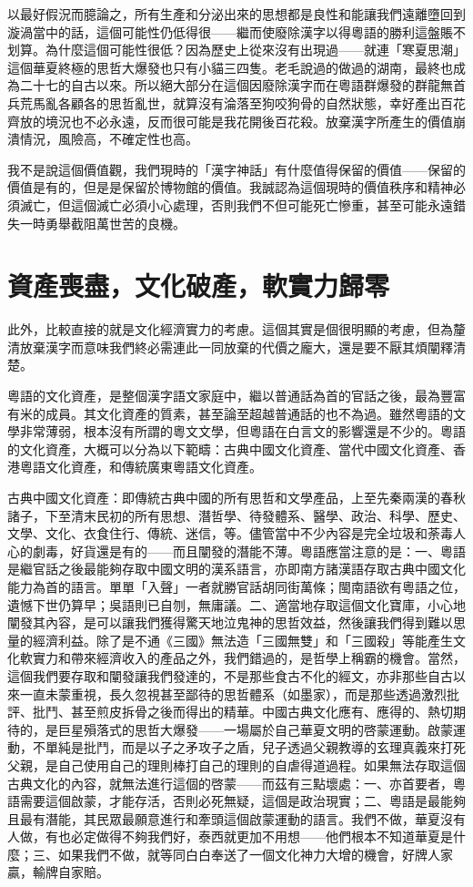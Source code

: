 \documentclass[a5paper, 10pt, openany]{book} %
\begin{document}
以最好假況而臆論之，所有生產和分泌出來的思想都是良性和能讓我們遠離墮回到漩渦當中的話，這個可能性仍低得很——繼而使廢除漢字以得粵語的勝利這盤賬不划算。為什麼這個可能性很低？因為歷史上從來沒有出現過——就連「寒夏思潮」這個華夏終極的思哲大爆發也只有小貓三四隻。老毛說過的做過的湖南，最終也成為二十七的自古以來。所以絕大部分在這個因廢除漢字而在粵語群爆發的群龍無首兵荒馬亂各顧各的思哲亂世，就算沒有淪落至狗咬狗骨的自然狀態，幸好產出百花齊放的境況也不必永遠，反而很可能是我花開後百花殺。放棄漢字所產生的價值崩潰情況，風險高，不確定性也高。

我不是說這個價值觀，我們現時的「漢字神話」有什麼值得保留的價值——保留的價值是有的，但是是保留於博物館的價值。我誠認為這個現時的價值秩序和精神必須滅亡，但這個滅亡必須小心處理，否則我們不但可能死亡慘重，甚至可能永遠錯失一時勇舉截阻萬世苦的良機。 

\section{資產喪盡，文化破產，軟實力歸零}

此外，比較直接的就是文化經濟實力的考慮。這個其實是個很明顯的考慮，但為釐清放棄漢字而意味我們終必需連此一同放棄的代價之龐大，還是要不厭其煩闡釋清楚。

粵語的文化資產，是整個漢字語文家庭中，繼以普通話為首的官話之後，最為豐富有米的成員。其文化資產的質素，甚至論至超越普通話的也不為過。雖然粵語的文學非常薄弱，根本沒有所謂的粵文文學，但粵語在白言文的影響還是不少的。粵語的文化資產，大概可以分為以下範疇：古典中國文化資產、當代中國文化資產、香港粵語文化資產，和傳統廣東粵語文化資產。

古典中國文化資產：即傳統古典中國的所有思哲和文學產品，上至先秦兩漢的春秋諸子，下至清末民初的所有思想、潛哲學、待發體系、醫學、政治、科學、歷史、文學、文化、衣食住行、傳統、迷信，等。儘管當中不少內容是完全垃圾和荼毒人心的劇毒，好貨還是有的——而且闡發的潛能不薄。粵語應當注意的是：一、粵語是繼官話之後最能夠存取中國文明的漢系語言，亦即南方諸漢語存取古典中國文化能力為首的語言。單單「入聲」一者就勝官話胡同街萬條；閩南語欲有粵語之位，遺憾下世仍算早；吳語則已自刎，無庸議。二、適當地存取這個文化寶庫，小心地闡發其內容，是可以讓我們獲得驚天地泣鬼神的思哲效益，然後讓我們得到難以思量的經濟利益。除了是不通《三國》無法造「三國無雙」和「三國殺」等能產生文化軟實力和帶來經濟收入的產品之外，我們錯過的，是哲學上稱霸的機會。當然，這個我們要存取和闡發讓我們發達的，不是那些食古不化的經文，亦非那些自古以來一直未蒙重視，長久忽視甚至鄙待的思哲體系（如墨家），而是那些透過激烈批評、批鬥、甚至煎皮拆骨之後而得出的精華。中國古典文化應有、應得的、熱切期待的，是巨星殞落式的思哲大爆發——一場屬於自己華夏文明的啓蒙運動。啟蒙運動，不單純是批鬥，而是以子之矛攻子之盾，兒子透過父親教導的玄理真義來打死父親，是自己使用自己的理則棒打自己的理則的自虐得道過程。如果無法存取這個古典文化的內容，就無法進行這個的啓蒙——而茲有三點壞處：一、亦首要者，粵語需要這個啟蒙，才能存活，否則必死無疑，這個是政治現實；二、粵語是最能夠且最有潛能，其民眾最願意進行和牽頭這個啟蒙運動的語言。我們不做，華夏沒有人做，有也必定做得不夠我們好，泰西就更加不用想——他們根本不知道華夏是什麼；三、如果我們不做，就等同白白奉送了一個文化神力大增的機會，好牌人家贏，輸牌自家賠。
\end{document}
